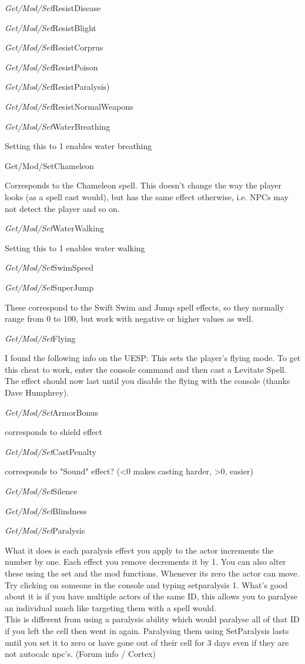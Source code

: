 \documentclass[
]{article}
\begin{document}
\emph{Get/Mod/Set}ResistDisease

\emph{Get/Mod/Set}ResistBlight

\emph{Get/Mod/Set}ResistCorprus

\emph{Get/Mod/Set}ResistPoison

\emph{Get/Mod/Set}ResistParalysis)

\emph{Get/Mod/Set}ResistNormalWeapons

\emph{Get/Mod/Set}WaterBreathing

Setting this to 1 enables water breathing

Get/Mod/SetChameleon

Corresponds to the Chameleon spell. This doesn't change the way the
player looks (as a spell cast would), but has the same effect otherwise,
i.e. NPCs may not detect the player and so on.

\emph{Get/Mod/Set}WaterWalking

Setting this to 1 enables water walking

\emph{Get/Mod/Set}SwimSpeed

\emph{Get/Mod/Set}SuperJump

These correspond to the Swift Swim and Jump spell effects, so they
normally range from 0 to 100, but work with negative or higher values as
well.

\emph{Get/Mod/Set}Flying

I found the following info on the UESP: This sets the player's flying
mode. To get this cheat to work, enter the console command and then cast
a Levitate Spell. The effect should now last until you disable the
flying with the console (thanks Dave Humphrey).

\emph{Get/Mod/Set}ArmorBonus

corresponds to shield effect

\emph{Get/Mod/Set}CastPenalty

corresponds to "Sound" effect? (\textless0 makes casting harder,
\textgreater0, easier)

\emph{Get/Mod/Set}Silence

\emph{Get/Mod/Set}Blindness

\emph{Get/Mod/Set}Paralysis

What it does is each paralysis effect you apply to the actor increments
the number by one. Each effect you remove decrements it by 1. You can
also alter these using the set and the mod functions. Whenever its zero
the actor can move. Try clicking on someone in the console and typing
setparalysis 1. What's good about it is if you have multiple actors of
the same ID, this allows you to paralyse an individual much like
targeting them with a spell would.\\
This is different from using a paralysis ability which would paralyse
all of that ID if you left the cell then went in again. Paralysing them
using SetParalysis lasts until you set it to zero or have gone out of
their cell for 3 days even if they are not autocalc npc's. (Forum info /
Cortex)
\end{document}
